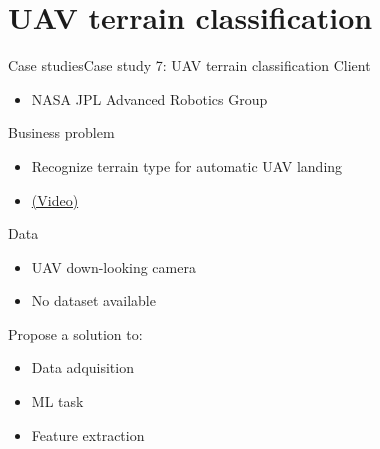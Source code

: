 \documentclass[10pt,compress]{beamer} %
\begin{document}
\section{UAV terrain classification}
\begin{frame}{Case studies}{Case study 7: UAV terrain classification}
		Client
		\begin{itemize}
			\item NASA JPL Advanced Robotics Group
		\end{itemize}
		Business problem
		\begin{itemize}
			\item Recognize terrain type for automatic UAV landing
			\item \href{https://www.youtube.com/watch?v=ovtpwxiIr_8}{(Video)}
		\end{itemize}
		Data
		\begin{itemize}
			\item UAV down-looking camera
			\item No dataset available
		\end{itemize}
		Propose a solution to:
		\begin{itemize}
			\item Data adquisition
			\item ML task
            \item Feature extraction
		\end{itemize}
\end{frame}
\end{document}
